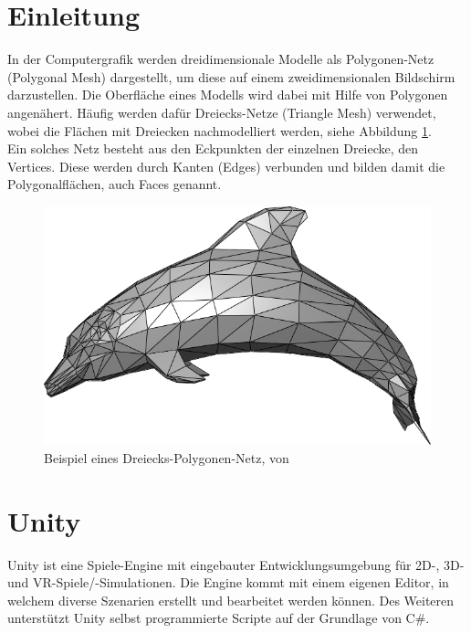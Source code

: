 \section{Einleitung}
In der Computergrafik werden dreidimensionale Modelle als Polygonen-Netz (Polygonal Mesh) dargestellt, um diese auf einem zweidimensionalen Bildschirm darzustellen. Die Oberfl\"ache eines Modells wird dabei mit Hilfe von Polygonen angen\"ahert. H\"aufig werden daf\"ur Dreiecks-Netze (Triangle Mesh) verwendet, wobei die Fl\"achen mit Dreiecken nachmodelliert werden, siehe Abbildung \ref{fig:dolphintrianglemesh}. 
\\Ein solches Netz besteht aus den Eckpunkten der einzelnen Dreiecke, den Vertices. Diese werden durch Kanten (Edges) verbunden und bilden damit die Polygonalfl\"achen, auch Faces genannt. 

\begin{figure}[h]
	\centering
	\includegraphics[width=0.7\linewidth]{Images/Dolphin_triangle_mesh}
	\caption[Beispiel eines Polygonen-Netzes]{Beispiel eines Dreiecks-Polygonen-Netz, von \cite{WikipediaDolphin1}}
	\label{fig:dolphintrianglemesh}
\end{figure}

\section{Unity}
Unity ist eine Spiele-Engine mit eingebauter Entwicklungsumgebung f\"ur 2D-, 3D- und VR-Spiele/-Simulationen. Die Engine kommt mit einem eigenen Editor, in welchem diverse Szenarien erstellt und bearbeitet werden k\"onnen. Des Weiteren unterst\"utzt Unity selbst programmierte Scripte auf der Grundlage von C\#.
